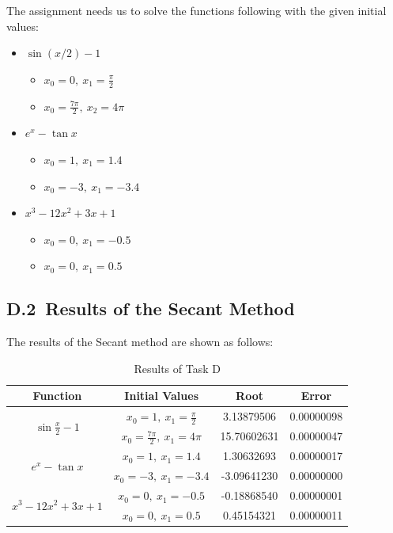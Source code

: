 \documentclass[a4paper]{article}
\begin{document}
The assignment needs us to solve the functions following with the given initial values:
\begin{itemize}
  \item $\sin (x/2) - 1$
  \begin{itemize}
    \item $x_0 = 0,\ x_1 = \frac{\pi}{2}$
    \item $x_0 = \frac{7\pi}{2},\ x_2 = 4\pi$
  \end{itemize}
  \item $e^x - \tan x$
  \begin{itemize}
    \item $x_0 = 1,\ x_1 = 1.4$
    \item $x_0 = -3,\ x_1 = -3.4$
  \end{itemize}
  \item $x^3 - 12x^2 + 3x + 1$
  \begin{itemize}
    \item $x_0 = 0,\ x_1 = -0.5$
    \item $x_0 = 0,\ x_1 = 0.5$
  \end{itemize}
\end{itemize}

\subsection*{D.2\ Results of the Secant Method}

The results of the Secant method are shown as follows:

\begin{table}[htbp]
  \centering
  \begin{tabular}{|c|c|c|c|}
    \hline 
    \textbf{Function} & \textbf{Initial Values} & \textbf{Root} & \textbf{Error} \\
    \hline
    \multirow{2}{*}{$\sin \frac{x}{2} - 1$} & $x_0 = 1,\ x_1 = \frac{\pi}{2}$ & 3.13879506 & 0.00000098 \\
    \cline{2-4}
    & $x_0 = \frac{7\pi}{2},\ x_1 = 4\pi$ & 15.70602631 & 0.00000047 \\
    \hline
    \multirow{2}{*}{$e^x - \tan x$} & $x_0 = 1,\ x_1 = 1.4$ & 1.30632693 & 0.00000017 \\
    \cline{2-4}
    & $x_0 = -3,\ x_1 = -3.4$ & -3.09641230 & 0.00000000 \\
    \hline
    \multirow{2}{*}{$x^3 - 12x^2 + 3x + 1$} & $x_0 = 0,\ x_1 = -0.5$ & -0.18868540 & 0.00000001 \\
    \cline{2-4}
    & $x_0 = 0,\ x_1 = 0.5$ & 0.45154321 & 0.00000011 \\
    \hline
  \end{tabular}
  \caption{Results of Task D}
  \label{tab:D}
\end{table}
\end{document}
